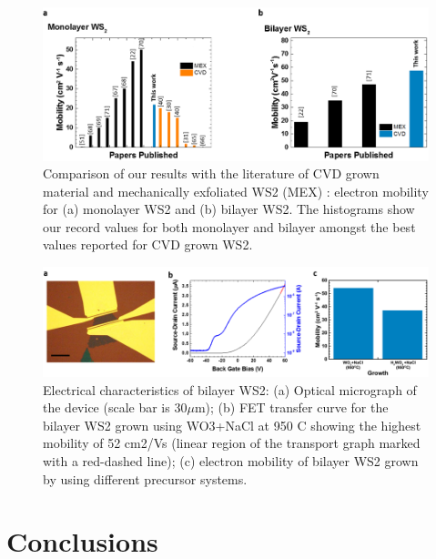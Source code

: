 \begin{figure}[h]
\begin{center}
\includegraphics[scale=0.3]{PaperMobilityComparison.png}
\caption{Comparison of our results with the literature of CVD grown material and mechanically exfoliated WS2 (MEX) : electron mobility for (a) monolayer WS2 and (b) bilayer WS2. The histograms show our record values for both monolayer and bilayer amongst the best values reported for CVD grown WS2.}
\label{fig:PaperMobilityComparison}
\end{center}
\end{figure}
 
\begin{figure}[h]
\begin{center}
\includegraphics[scale=0.3]{PaperElectricalMeasurementBilayer.png}
\caption{Electrical characteristics of bilayer WS2: (a) Optical micrograph of the device (scale bar is 30$\mu$m); (b) FET transfer curve for the bilayer WS2 grown using WO3+NaCl at 950 {\degree}C showing the highest mobility of 52 cm2/Vs (linear region of the transport graph marked with a red-dashed line); (c) electron mobility of bilayer WS2 grown by using different precursor systems.}
\label{fig:PaperElectricalMeasurementBilayer}
\end{center}
\end{figure}

\section{Conclusions}

